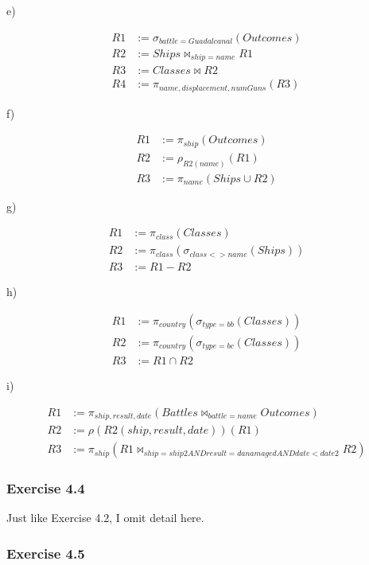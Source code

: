 \documentclass[../../main.tex]{subfiles}
\begin{document}
e)

\begin{align*}
  R1 &:= \sigma_{battle = Guadalcanal}(Outcomes) \\
  R2 &:= Ships \bowtie_{ship = name} R1 \\
  R3 &:= Classes \bowtie R2 \\
  R4 &:= \pi_{name, displacement, numGuns}(R3)
\end{align*}

f)

\begin{align*}
  R1 &:= \pi_{ship}(Outcomes) \\
  R2 &:= \rho_{R2(name)}(R1) \\
  R3 &:= \pi_{name}(Ships \cup R2)
\end{align*}

g)

\begin{align*}
  R1 &:= \pi_{class}(Classes) \\
  R2 &:= \pi_{class}(\sigma_{class <> name}(Ships)) \\
  R3 &:= R1 - R2
\end{align*}

h)

\begin{align*}
  R1 &:= \pi_{country}(\sigma_{type=bb}(Classes)) \\
  R2 &:= \pi_{country}(\sigma_{type=bc}(Classes)) \\
  R3 &:= R1 \cap R2
\end{align*}

i)

\begin{align*}
  R1 &:= \pi_{ship, result, date}(Battles
         \bowtie_{battle = name} Outcomes) \\
  R2 &:= \rho(R2(ship, result, date))(R1) \\
  R3 &:= \pi_{ship}(R1 \bowtie_{ship = ship2 AND
         result = danamaged AND date < date2} R2)
\end{align*}

\subsubsection*{Exercise 4.4}

Just like Exercise 4.2, I omit detail here.

\subsubsection*{Exercise 4.5}
\end{document}
